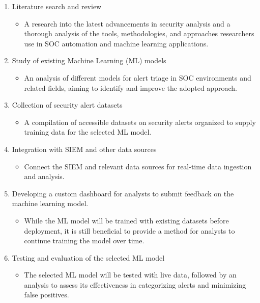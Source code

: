 \begin{enumerate}
    \item Literature search and review
    \begin{itemize}
        \item A research into the latest advancements in security analysis and a thorough analysis of the tools, methodologies, and approaches researchers use in SOC automation and machine learning applications.
    \end{itemize}
    
    \item Study of existing Machine Learning (ML) models
    \begin{itemize}
        \item An analysis of different models for alert triage in SOC environments and related fields, aiming to identify and improve the adopted approach.
    \end{itemize}
    
    \item Collection of security alert datasets
    \begin{itemize}
        \item A compilation of accessible datasets on security alerts organized to supply training data for the selected ML model.
    \end{itemize}

    \item Integration with SIEM and other data sources
    \begin{itemize}
        \item Connect the SIEM and relevant data sources for real-time data ingestion and analysis.
    \end{itemize}
    
    \item Developing a custom dashboard for analysts to submit feedback on the machine learning model.
    \begin{itemize}
        \item While the ML model will be trained with existing datasets before deployment, it is still beneficial to provide a method for analysts to continue training the model over time.
    \end{itemize}
    
    \item Testing and evaluation of the selected ML model
    \begin{itemize}
        \item The selected ML model will be tested with live data, followed by an analysis to assess its effectiveness in categorizing alerts and minimizing false positives.
    \end{itemize}
\end{enumerate}

